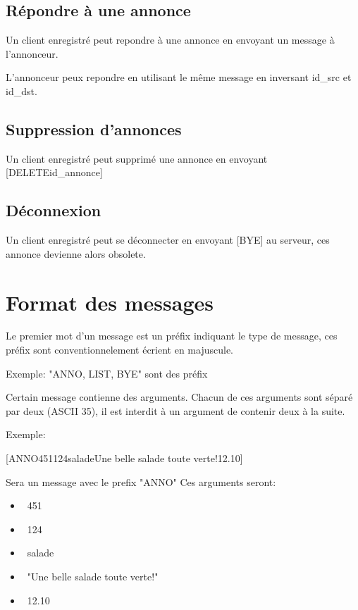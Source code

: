 \documentclass[12pt]{article}
\begin{document}
\subsection{Répondre à une annonce}

Un client enregistré peut repondre à une annonce en envoyant un message  à l'annonceur.

L'annonceur peux repondre en utilisant le même message en inversant id\_src et id\_dst.



\subsection{Suppression d'annonces}

Un client enregistré peut supprimé une annonce en envoyant [DELETE\separator{}id\_annonce]


\subsection{Déconnexion}

Un client enregistré peut se déconnecter en envoyant [BYE] au serveur, ces annonce devienne alors obsolete.

\section{Format des messages}


Le premier mot d'un message est un préfix indiquant le type de message, ces préfix sont conventionnelement écrient en majuscule.

Exemple: "ANNO, LIST, BYE" sont des préfix

Certain message contienne des arguments. Chacun de ces arguments sont séparé par deux \separator{} (ASCII 35),
il est interdit à un argument de contenir deux \separator{} à la suite.

Exemple:

[ANNO\separator{}451\separator{}124\separator{}salade\separator{}Une belle salade toute verte!\separator{}12.10]

Sera un message avec le prefix "ANNO"
Ces arguments seront:
\begin{itemize}
  \item~451
  \item~124
  \item~salade
  \item~"Une belle salade toute verte!"
  \item~12.10
\end{itemize}
\end{document}
